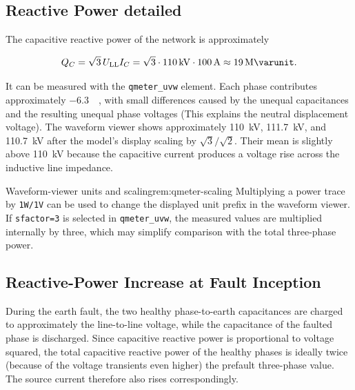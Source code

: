 \subsection{Reactive Power detailed}
\label{sec:earth-fault-reactive-power}

The capacitive reactive power of the network is approximately

\begin{equation}
	Q_C=\sqrt{3}\,U_{\mathrm{LL}}I_C
	=\sqrt{3}\cdot\SI{110}{\kilo\volt}\cdot\SI{100}{\ampere}
	\approx\SI{19}{\mega\varunit}.
	\label{eq:network-capacitive-reactive-power}
\end{equation}

It can be measured with the \texttt{qmeter\_uvw} element. Each phase contributes
approximately \SI{-6.3}{\mega\varunit}, with small differences caused by the
unequal capacitances and the resulting unequal phase voltages (This explains the neutral displacement voltage). The waveform
viewer shows approximately \SI{110}{\kilo\volt},
\SI{111.7}{\kilo\volt}, and \SI{110.7}{\kilo\volt} after the model's display
scaling by $\sqrt{3}/\sqrt{2}$. Their mean is slightly above
\SI{110}{\kilo\volt} because the capacitive current produces a voltage rise
across the inductive line impedance.

\begin{remark}{Waveform-viewer units and scaling}{rem:qmeter-scaling}
	Multiplying a power trace by \texttt{1W/1V} can be used to change the displayed
	unit prefix in the waveform viewer. If \texttt{sfactor=3} is selected in
	\texttt{qmeter\_uvw}, the measured values are multiplied internally by three,
	which may simplify comparison with the total three-phase power.
\end{remark}


\subsection{Reactive-Power Increase at Fault Inception}
\label{sec:earth-fault-reactive-power-doubling}

During the earth fault, the two healthy phase-to-earth capacitances are charged
to approximately the line-to-line voltage, while the capacitance of the
faulted phase is discharged. Since capacitive reactive power is proportional
to voltage squared, the total capacitive reactive power of the healthy phases
is ideally twice (because of the voltage transients even higher) the prefault three-phase value. The source current therefore
also rises correspondingly.

